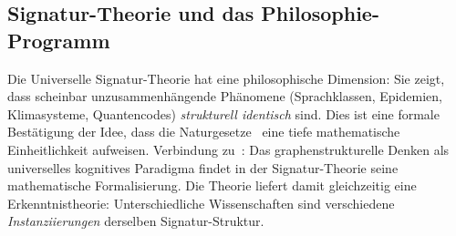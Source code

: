 ﻿\documentclass[a4paper,12pt]{article}
\theoremstyle{definition}
\begin{document}
\subsection{Signatur-Theorie und das Philosophie-Programm}

Die Universelle Signatur-Theorie hat eine philosophische Dimension:
Sie zeigt, dass scheinbar unzusammenh\"angende Ph\"anomene
(Sprachklassen, Epidemien, Klimasysteme, Quantencodes) \emph{strukturell identisch}
sind. Dies ist eine formale Best\"atigung der Idee, dass die Naturgesetze~\cite{epp2026naturgesetze}
eine tiefe mathematische Einheitlichkeit aufweisen.
Verbindung zu~\cite{epp2026graphdenk}: Das graphenstrukturelle Denken
als universelles kognitives Paradigma findet in der Signatur-Theorie
seine mathematische Formalisierung.
Die Theorie liefert damit gleichzeitig eine Erkenntnistheorie:
Unterschiedliche Wissenschaften sind verschiedene
\emph{Instanziierungen} derselben Signatur-Struktur.
\end{document}
